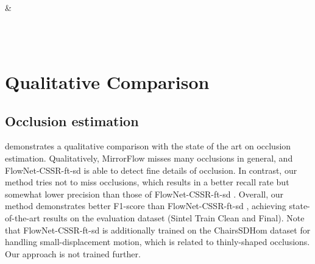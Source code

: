 \documentclass[10pt,twocolumn,letterpaper]{article}
\newcommand*\circled[1]{\tikz[baseline=(char.base)]{
        \node[shape=circle,draw,fill=white,minimum size=3mm,inner sep=0pt] (char)
        {\vphantom{1g}\emph{#1}};}}
\begin{document}
\begin{figure*}[t]
\begin{figure*}[t]
\begin{minipage}{0.245\textwidth}
{\begin{figure*}[ht]
\begin{tabular}
&
	\\ \\
\end{tabular}
\caption {\textbf{More qualitative examples from the ablation study on PWC-Net}: \emph{(a)} overlapped input images, \emph{(b)} the original PWC-Net \cite{Sun:2017:PWC}, \emph{(c)} PWC-Net with Bi, \emph{(d)} PWC-Net with Occ, \emph{(e)} PWC-Net with Bi-Occ, \emph{(f)} optical flow ground truth, \emph{(g)} PWC-Net with IRR, \emph{(h)} PWC-Net with Occ-IRR, \emph{(i)} PWC-Net with Bi-Occ-IRR, and \emph{(j)} our full model (i.e. IRR-PWC). Our full model significantly improves flow estimation over the original PWC-Net with fewer missing details and clearer motion boundaries. Note that there are gradual improvements when combining several of the proposed components.}
\label{fig:pwc_ablation_more}
\end{figure*}
}









 

\section{Qualitative Comparison}
\label{sec:comparison}

\subsection{Occlusion estimation}

 demonstrates a qualitative comparison with the state of the art on occlusion estimation. 
Qualitatively, MirrorFlow \cite{Hur:2017:MFE} misses many occlusions in general, and FlowNet-CSSR-ft-sd \cite{Ilg:2018:OMD} is able to detect fine details of occlusion.
In contrast, our method tries not to miss occlusions, which results in a better recall rate but somewhat lower precision than those of FlowNet-CSSR-ft-sd \cite{Ilg:2018:OMD}.
Overall, our method demonstrates better F1-score than FlowNet-CSSR-ft-sd \cite{Ilg:2018:OMD}, achieving state-of-the-art results on the evaluation dataset (\ie Sintel Train Clean and Final).
Note that FlowNet-CSSR-ft-sd \cite{Ilg:2018:OMD} is additionally trained on the ChairsSDHom dataset \cite{Ilg:2017:FN2} for handling small-displacement motion, which is related to thinly-shaped occlusions.
Our approach is not trained further.


\end{minipage}
\end{figure*}
\end{figure*}
\end{document}
